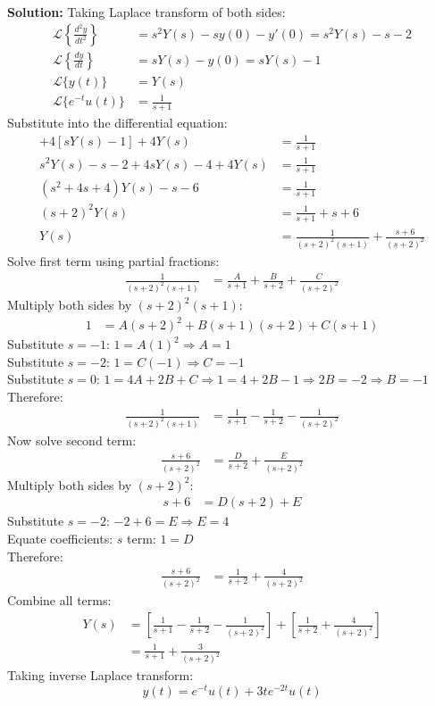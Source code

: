 \documentclass{article}
\begin{document}
\textbf{Solution:}
Taking Laplace transform of both sides:
\begin{align*}
    \mathcal{L}\left\{\frac{d^2y}{dt^2}\right\} &= s^2Y(s) - sy(0) - y'(0) = s^2Y(s) - s - 2 \\
    \mathcal{L}\left\{\frac{dy}{dt}\right\} &= sY(s) - y(0) = sY(s) - 1 \\
    \mathcal{L}\{y(t)\} &= Y(s) \\
    \mathcal{L}\{e^{-t}u(t)\} &= \frac{1}{s + 1}
\end{align*}
Substitute into the differential equation:
\begin{align*}
    [s^2Y(s) - s - 2] + 4[sY(s) - 1] + 4Y(s) &= \frac{1}{s + 1} \\
    s^2Y(s) - s - 2 + 4sY(s) - 4 + 4Y(s) &= \frac{1}{s + 1} \\
    (s^2 + 4s + 4)Y(s) - s - 6 &= \frac{1}{s + 1} \\
    (s + 2)^2Y(s) &= \frac{1}{s + 1} + s + 6 \\
    Y(s) &= \frac{1}{(s + 2)^2(s + 1)} + \frac{s + 6}{(s + 2)^2}
\end{align*}
Solve first term using partial fractions:
\begin{align*}
    \frac{1}{(s + 2)^2(s + 1)} &= \frac{A}{s + 1} + \frac{B}{s + 2} + \frac{C}{(s + 2)^2}
\end{align*}
Multiply both sides by $(s + 2)^2(s + 1)$:
\begin{align*}
    1 &= A(s + 2)^2 + B(s + 1)(s + 2) + C(s + 1)
\end{align*}
Substitute $s = -1$: $1 = A(1)^2 \Rightarrow A = 1$ \\
Substitute $s = -2$: $1 = C(-1) \Rightarrow C = -1$ \\
Substitute $s = 0$: $1 = 4A + 2B + C \Rightarrow 1 = 4 + 2B - 1 \Rightarrow 2B = -2 \Rightarrow B = -1$ \\
Therefore:
\begin{align*}
    \frac{1}{(s + 2)^2(s + 1)} &= \frac{1}{s + 1} - \frac{1}{s + 2} - \frac{1}{(s + 2)^2}
\end{align*}
Now solve second term:
\begin{align*}
    \frac{s + 6}{(s + 2)^2} &= \frac{D}{s + 2} + \frac{E}{(s + 2)^2}
\end{align*}
Multiply both sides by $(s + 2)^2$:
\begin{align*}
    s + 6 &= D(s + 2) + E
\end{align*}
Substitute $s = -2$: $-2 + 6 = E \Rightarrow E = 4$ \\
Equate coefficients: $s$ term: $1 = D$ \\
Therefore:
\begin{align*}
    \frac{s + 6}{(s + 2)^2} &= \frac{1}{s + 2} + \frac{4}{(s + 2)^2}
\end{align*}
Combine all terms:
\begin{align*}
    Y(s) &= \left[\frac{1}{s + 1} - \frac{1}{s + 2} - \frac{1}{(s + 2)^2}\right] + \left[\frac{1}{s + 2} + \frac{4}{(s + 2)^2}\right] \\
    &= \frac{1}{s + 1} + \frac{3}{(s + 2)^2}
\end{align*}
Taking inverse Laplace transform:
\[ y(t) = e^{-t}u(t) + 3te^{-2t}u(t) \]
\end{document}
